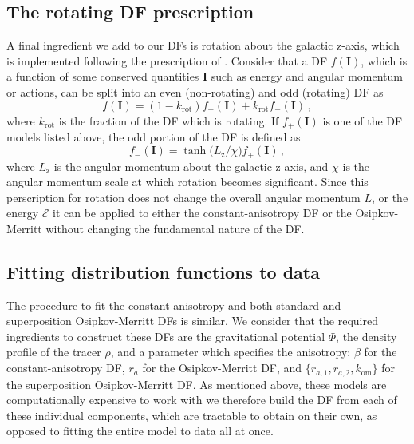 \subsection{The rotating DF prescription}
\label{ch4:subsec:rotating-df-prescription}

A final ingredient we add to our DFs is rotation about the galactic z-axis, which is implemented following the prescription of \textcite{binney14d} \parencite[see also][for an equivalent implementation using constant anisotropy DFs]{deason11}. Consider that a DF $f(\mathbf{I})$, which is a function of some conserved quantities $\mathbf{I}$ such as energy and angular momentum or actions, can be split into an even (non-rotating) and odd (rotating) DF as 
\begin{equation}
    \label{ch4:eq:even-odd-df}
    f(\mathbf{I}) = (1-k_\mathrm{rot})f_{+}(\mathbf{I}) + k_\mathrm{rot}f_{-}(\mathbf{I})\,,
\end{equation}
\noindent where $k_\mathrm{rot}$ is the fraction of the DF which is rotating. If $f_{+}(\mathbf{I})$ is one of the DF models listed above, the odd portion of the DF is defined as
\begin{equation}
    \label{ch4:eq:rotating-df-kernel}
    f_{-}(\mathbf{I}) = \tanh \big( L_{\mathrm{z}}/\chi \big) f_{+}(\mathbf{I})\,,
\end{equation}
\noindent where $L_{\mathrm{z}}$ is the angular momentum about the galactic z-axis, and $\chi$ is the angular momentum scale at which rotation becomes significant. Since this perscription for rotation does not change the overall angular momentum $L$, or the energy $\mathcal{E}$ it can be applied to either the constant-anisotropy DF or the Osipkov-Merritt without changing the fundamental nature of the DF.

\subsection{Fitting distribution functions to data}
\label{ch4:subsec:fitting-constant-anisotropy-osipkov-merritt-dfs}

The procedure to fit the constant anisotropy and both standard and superposition Osipkov-Merritt DFs is similar. We consider that the required ingredients to construct these DFs are the gravitational potential $\Phi$, the density profile of the tracer $\rho$, and a parameter which specifies the anisotropy: $\beta$ for the constant-anisotropy DF, $r_{a}$ for the Osipkov-Merritt DF, and $\{ r_{a,1},r_{a,2},k_\mathrm{om} \}$ for the superposition Osipkov-Merritt DF. As mentioned above, these models are computationally expensive to work with we therefore build the DF from each of these individual components, which are tractable to obtain on their own, as opposed to fitting the entire model to data all at once. 

